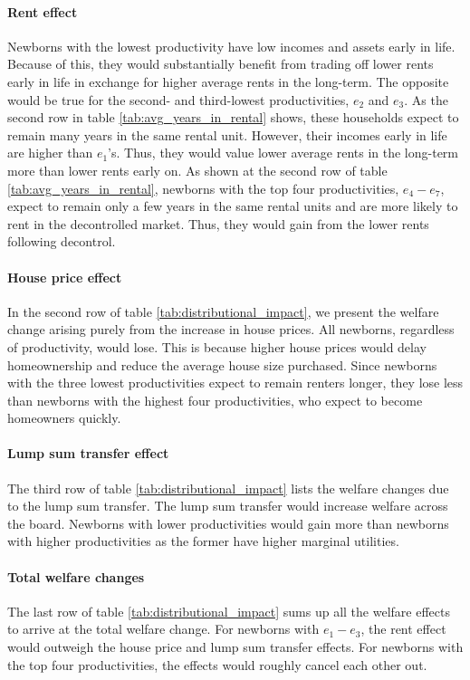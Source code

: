 \documentclass[parskip=full]{article}
\begin{document}
\paragraph{Rent effect} Newborns with the lowest productivity have low incomes and assets early in life. Because of this, they would substantially benefit from trading off lower rents early in life in exchange for higher average rents in the long-term. The opposite would be true for the second- and third-lowest productivities, $e_{2}$ and $e_{3}$. As the second row in table \ref{tab:avg_years_in_rental} shows, these households expect to remain many years in the same rental unit. However, their incomes early in life are higher than $e_{1}$'s. Thus, they would value lower average rents in the long-term more than lower rents early on. As shown at the second row of table \ref{tab:avg_years_in_rental}, newborns with the top four productivities, $e_{4}-e_{7}$, expect to remain only a few years in the same rental units and are more likely to rent in the decontrolled market. Thus, they would gain from the lower rents following decontrol.

\paragraph{House price effect} In the second row of table \ref{tab:distributional_impact}, we present the welfare change arising purely from the increase in house prices. All newborns, regardless of productivity, would lose. This is because higher house prices would delay homeownership and reduce the average house size purchased. Since newborns with the three lowest productivities expect to remain renters longer, they lose less than newborns with the highest four productivities, who expect to become homeowners quickly. 

\paragraph{Lump sum transfer effect} The third row of table \ref{tab:distributional_impact} lists the welfare changes due to the lump sum transfer. The lump sum transfer would increase welfare across the board. Newborns with lower productivities would gain more than newborns with higher productivities as the former have higher marginal utilities.

\paragraph{Total welfare changes} The last row of table \ref{tab:distributional_impact} sums up all the welfare effects to arrive at the total welfare change. For newborns with $e_{1}-e_{3}$, the rent effect would outweigh the house price and lump sum transfer effects. For newborns with the top four productivities, the effects would roughly cancel each other out. 
\end{document}
